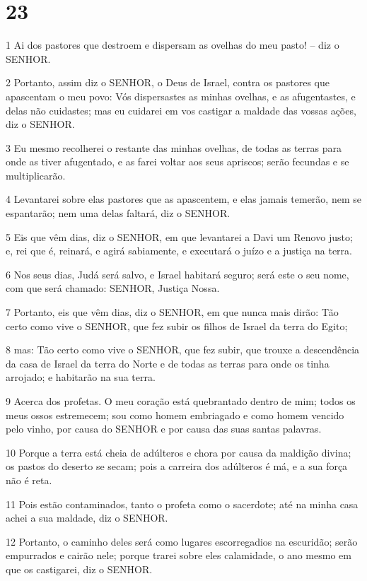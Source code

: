 \chapter{23}

\par 1 Ai dos pastores que destroem e dispersam as ovelhas do meu pasto! -- diz o SENHOR.
\par 2 Portanto, assim diz o SENHOR, o Deus de Israel, contra os pastores que apascentam o meu povo: Vós dispersastes as minhas ovelhas, e as afugentastes, e delas não cuidastes; mas eu cuidarei em vos castigar a maldade das vossas ações, diz o SENHOR.
\par 3 Eu mesmo recolherei o restante das minhas ovelhas, de todas as terras para onde as tiver afugentado, e as farei voltar aos seus apriscos; serão fecundas e se multiplicarão.
\par 4 Levantarei sobre elas pastores que as apascentem, e elas jamais temerão, nem se espantarão; nem uma delas faltará, diz o SENHOR.
\par 5 Eis que vêm dias, diz o SENHOR, em que levantarei a Davi um Renovo justo; e, rei que é, reinará, e agirá sabiamente, e executará o juízo e a justiça na terra.
\par 6 Nos seus dias, Judá será salvo, e Israel habitará seguro; será este o seu nome, com que será chamado: SENHOR, Justiça Nossa.
\par 7 Portanto, eis que vêm dias, diz o SENHOR, em que nunca mais dirão: Tão certo como vive o SENHOR, que fez subir os filhos de Israel da terra do Egito;
\par 8 mas: Tão certo como vive o SENHOR, que fez subir, que trouxe a descendência da casa de Israel da terra do Norte e de todas as terras para onde os tinha arrojado; e habitarão na sua terra.
\par 9 Acerca dos profetas. O meu coração está quebrantado dentro de mim; todos os meus ossos estremecem; sou como homem embriagado e como homem vencido pelo vinho, por causa do SENHOR e por causa das suas santas palavras.
\par 10 Porque a terra está cheia de adúlteros e chora por causa da maldição divina; os pastos do deserto se secam; pois a carreira dos adúlteros é má, e a sua força não é reta.
\par 11 Pois estão contaminados, tanto o profeta como o sacerdote; até na minha casa achei a sua maldade, diz o SENHOR.
\par 12 Portanto, o caminho deles será como lugares escorregadios na escuridão; serão empurrados e cairão nele; porque trarei sobre eles calamidade, o ano mesmo em que os castigarei, diz o SENHOR.
